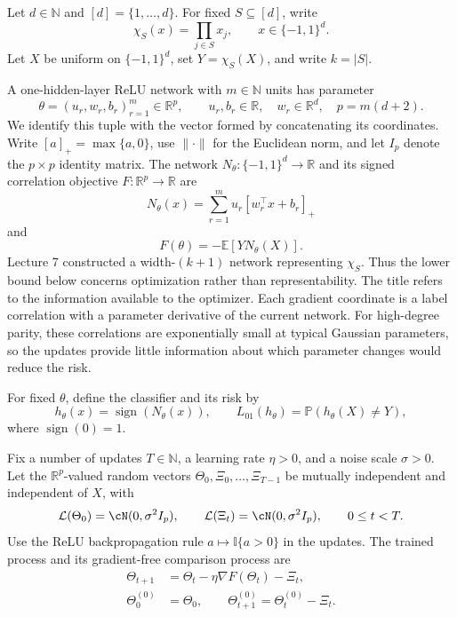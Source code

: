 \documentclass[11pt,twoside]{article}
\newcommand{\E}{\mathbb E}
\newcommand{\I}{\mathbb I}
\renewcommand{\P}{\mathbb P}
\newcommand{\Law}{\mathcal L}
\newcommand{\R}{\mathbb R}
\theoremstyle{definition}
\theoremstyle{remark}
\begin{document}
Let $d\in\mathbb N$ and $[d]=\{1,\ldots,d\}$. For fixed $S\subseteq[d]$, write
\[
\chi_S(x)=\prod_{j\in S}x_j,
\qquad x\in\{-1,1\}^d.
\]
Let $X$ be uniform on $\{-1,1\}^d$, set $Y=\chi_S(X)$, and write $k=|S|$.

A one-hidden-layer ReLU network with $m\in\mathbb N$ units has parameter
\[
\theta=(u_r,w_r,b_r)_{r=1}^m\in\R^p,
\qquad u_r,b_r\in\R,\quad w_r\in\R^d,\quad p=m(d+2).
\]
We identify this tuple with the vector formed by concatenating its
coordinates. Write $[a]_+=\max\{a,0\}$, use $\|\cdot\|$ for the Euclidean
norm, and let $I_p$ denote the $p\times p$ identity matrix.
The network $N_\theta:\{-1,1\}^d\to\R$ and its signed correlation objective
$F:\R^p\to\R$ are
\begin{equation}
N_\theta(x)=\sum_{r=1}^m u_r[w_r^\top x+b_r]_+
\label{eq:relu-network}
\end{equation}
and
\begin{equation}
F(\theta)=-\E[Y N_\theta(X)].
\label{eq:correlation-objective}
\end{equation}
Lecture 7 constructed a width-$(k+1)$ network representing $\chi_S$. Thus
the lower bound below concerns optimization rather than representability.
The title refers to the information available to the optimizer. Each gradient
coordinate is a label correlation with a parameter derivative of the current
network. For high-degree parity, these correlations are exponentially small
at typical Gaussian parameters, so the updates provide little information
about which parameter changes would reduce the risk.

For fixed $\theta$, define the classifier and its risk by
\[
h_\theta(x)=\operatorname{sign}(N_\theta(x)),
\qquad
L_{01}(h_\theta)=\P(h_\theta(X)\ne Y),
\]
where $\operatorname{sign}(0)=1$.\label{en:zero-output}

Fix a number of updates $T\in\mathbb N$, a learning rate $\eta>0$, and a
noise scale $\sigma>0$. Let the
$\R^p$-valued random vectors $\Theta_0,\Xi_0,\ldots,\Xi_{T-1}$ be mutually
independent and independent of $X$, with
\[
\Law(\Theta_0)=\cN(0,\sigma^2I_p),
\qquad
\Law(\Xi_t)=\cN(0,\sigma^2I_p),\qquad 0\le t<T.
\]
Use the ReLU backpropagation rule $a\mapsto\I\{a>0\}$ in the updates.
The trained process and its gradient-free comparison process are
\begin{align}
\Theta_{t+1}&=\Theta_t-\eta\nabla F(\Theta_t)-\Xi_t,
\label{eq:perturbed-gd}\\
\Theta^{(0)}_0&=\Theta_0,
\qquad
\Theta^{(0)}_{t+1}=\Theta^{(0)}_t-\Xi_t.
\label{eq:gaussian-walk}
\end{align}
\end{document}
